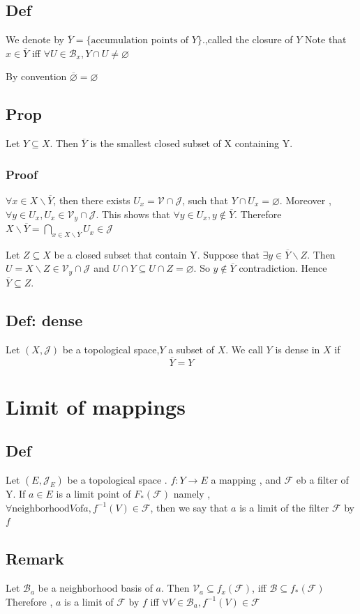 \documentclass{book}
\begin{document}
\section{Def}
We denote by $\overline{Y}=\{\text{accumulation points of }Y\}.$,called the closure of $Y$ Note that $x\in\overline{Y}$ iff $\forall U\in \mathscr{B}_x,Y\cap U\not=\varnothing$

By convention $\overline{\varnothing}=\varnothing$
\section{Prop}
Let $Y\subseteq X$. Then $\overline{Y}$ is the smallest closed subset of X containing Y.
\subsection*{Proof}
$\forall x\in X\backslash \overline{Y}$, then there exists $U_x=\mathcal{V}\cap \mathcal{J}$, such that $Y\cap U_x=\varnothing$. Moreover , $\forall y\in U_x, U_x\in \mathcal{V}_y\cap\mathcal{J}$. This shows that $\forall y\in U_x,y\not\in \overline{Y}$. Therefore $X\backslash\overline{Y}=\bigcap\limits_{x\in X\backslash\overline{Y}}U_x\in \mathcal{J}$

Let $Z\subseteq X$ be a closed subset that contain Y. Suppose that $\exists y\in \overline{Y}\backslash Z.$ Then $U=X\backslash Z\in \mathcal{V}_y\cap\mathcal{J}$ and $U\cap Y\subseteq U\cap Z=\varnothing$. So $y\not\in \overline{ Y}$ contradiction. Hence $\overline{Y}\subseteq Z.$
\section{Def: dense}
Let $(X,\mathcal{J})$ be a topological space,$Y$ a subset of $X$. We call $Y$ is dense in $X$ if $$\overline{Y}=Y$$
\chapter{Limit of mappings}
\section{Def}
Let $(E,\mathcal{J}_E)$ be a topological space . $f: Y\rightarrow E$ a mapping , and $\mathcal{F}$ eb a filter of Y. If $a\in E$ is a limit point of $F_*(\mathcal{F})$ namely , $\forall \text{neighborhood} V \text{of} a,f^{-1}(V)\in \mathcal{F}$, then we say that $a$ is a limit of the filter $\mathcal{F}$ by $f$
\section{Remark}
Let $\mathscr{B}_a$ be a neighborhood basis of $a$. Then $\mathcal{V}_a\subseteq f_x(\mathcal{F})$, iff $\mathscr{B}\subseteq f_* (\mathcal{F})$ Therefore , $a$ is a limit of $\mathcal{F}$ by $f$ iff $\forall V\in\mathscr{B}_a,f^{-1}(V)\in\mathcal{F}$
\end{document}
